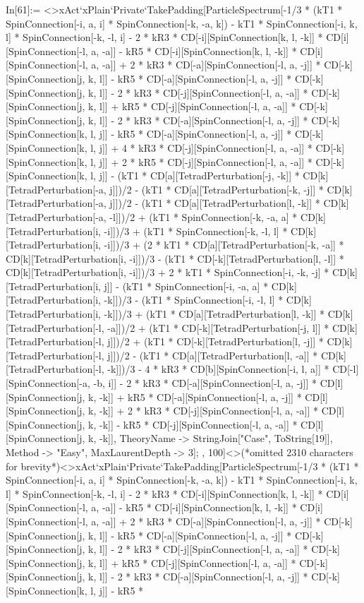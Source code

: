 In[61]:= <>xAct`xPlain`Private`TakePadding[ParticleSpectrum[-1/3 * (kT1 * SpinConnection[-i, a, i] * SpinConnection[-k, -a, k]) - kT1 * SpinConnection[-i, k, l] * SpinConnection[-k, -l, i] - 2 * kR3 * CD[-i][SpinConnection[k, l, -k]] * CD[i][SpinConnection[-l, a, -a]] - kR5 * CD[-i][SpinConnection[k, l, -k]] * CD[i][SpinConnection[-l, a, -a]] + 2 * kR3 * CD[-a][SpinConnection[-l, a, -j]] * CD[-k][SpinConnection[j, k, l]] - kR5 * CD[-a][SpinConnection[-l, a, -j]] * CD[-k][SpinConnection[j, k, l]] - 2 * kR3 * CD[-j][SpinConnection[-l, a, -a]] * CD[-k][SpinConnection[j, k, l]] + kR5 * CD[-j][SpinConnection[-l, a, -a]] * CD[-k][SpinConnection[j, k, l]] - 2 * kR3 * CD[-a][SpinConnection[-l, a, -j]] * CD[-k][SpinConnection[k, l, j]] - kR5 * CD[-a][SpinConnection[-l, a, -j]] * CD[-k][SpinConnection[k, l, j]] + 4 * kR3 * CD[-j][SpinConnection[-l, a, -a]] * CD[-k][SpinConnection[k, l, j]] + 2 * kR5 * CD[-j][SpinConnection[-l, a, -a]] * CD[-k][SpinConnection[k, l, j]] - (kT1 * CD[a][TetradPerturbation[-j, -k]] * CD[k][TetradPerturbation[-a, j]])/2 - (kT1 * CD[a][TetradPerturbation[-k, -j]] * CD[k][TetradPerturbation[-a, j]])/2 - (kT1 * CD[a][TetradPerturbation[l, -k]] * CD[k][TetradPerturbation[-a, -l]])/2 + (kT1 * SpinConnection[-k, -a, a] * CD[k][TetradPerturbation[i, -i]])/3 + (kT1 * SpinConnection[-k, -l, l] * CD[k][TetradPerturbation[i, -i]])/3 + (2 * kT1 * CD[a][TetradPerturbation[-k, -a]] * CD[k][TetradPerturbation[i, -i]])/3 - (kT1 * CD[-k][TetradPerturbation[l, -l]] * CD[k][TetradPerturbation[i, -i]])/3 + 2 * kT1 * SpinConnection[-i, -k, -j] * CD[k][TetradPerturbation[i, j]] - (kT1 * SpinConnection[-i, -a, a] * CD[k][TetradPerturbation[i, -k]])/3 - (kT1 * SpinConnection[-i, -l, l] * CD[k][TetradPerturbation[i, -k]])/3 + (kT1 * CD[a][TetradPerturbation[l, -k]] * CD[k][TetradPerturbation[-l, -a]])/2 + (kT1 * CD[-k][TetradPerturbation[-j, l]] * CD[k][TetradPerturbation[-l, j]])/2 + (kT1 * CD[-k][TetradPerturbation[l, -j]] * CD[k][TetradPerturbation[-l, j]])/2 - (kT1 * CD[a][TetradPerturbation[l, -a]] * CD[k][TetradPerturbation[-l, -k]])/3 - 4 * kR3 * CD[b][SpinConnection[-i, l, a]] * CD[-l][SpinConnection[-a, -b, i]] - 2 * kR3 * CD[-a][SpinConnection[-l, a, -j]] * CD[l][SpinConnection[j, k, -k]] + kR5 * CD[-a][SpinConnection[-l, a, -j]] * CD[l][SpinConnection[j, k, -k]] + 2 * kR3 * CD[-j][SpinConnection[-l, a, -a]] * CD[l][SpinConnection[j, k, -k]] - kR5 * CD[-j][SpinConnection[-l, a, -a]] * CD[l][SpinConnection[j, k, -k]], TheoryName -> StringJoin["Case", ToString[19]], Method -> "Easy", MaxLaurentDepth -> 3]; , 100]<>(*omitted 2310 characters for brevity*)<>xAct`xPlain`Private`TakePadding[ParticleSpectrum[-1/3 * (kT1 * SpinConnection[-i, a, i] * SpinConnection[-k, -a, k]) - kT1 * SpinConnection[-i, k, l] * SpinConnection[-k, -l, i] - 2 * kR3 * CD[-i][SpinConnection[k, l, -k]] * CD[i][SpinConnection[-l, a, -a]] - kR5 * CD[-i][SpinConnection[k, l, -k]] * CD[i][SpinConnection[-l, a, -a]] + 2 * kR3 * CD[-a][SpinConnection[-l, a, -j]] * CD[-k][SpinConnection[j, k, l]] - kR5 * CD[-a][SpinConnection[-l, a, -j]] * CD[-k][SpinConnection[j, k, l]] - 2 * kR3 * CD[-j][SpinConnection[-l, a, -a]] * CD[-k][SpinConnection[j, k, l]] + kR5 * CD[-j][SpinConnection[-l, a, -a]] * CD[-k][SpinConnection[j, k, l]] - 2 * kR3 * CD[-a][SpinConnection[-l, a, -j]] * CD[-k][SpinConnection[k, l, j]] - kR5 * 